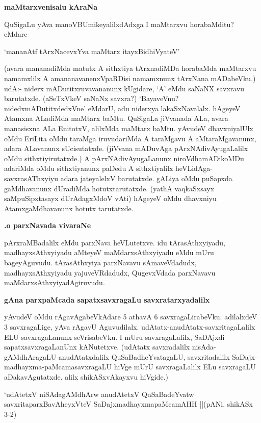   \noindent
  \textbf{maMtarxvenisalu kAraNa}\label{page120}
  
  QuSigaLu yAva manoVBUmikeyalilxdAdxga I maMtarxvu horabaMditu? eMdare-
 
 \begin{shloka}
 `mananAtf tArxNacevxYva maMtarx itayxBidhiVyateV'\label{121}
 \end{shloka}

(avara mananadiMda matutx A sithxtiya tArxnadiMDa horabaMda maMtarxvu namamxlilx A amananavanenxVpaRDisi namamxnunx tArxNana mADabeVku.) udA:- niderx
mADutitxruvavananunx kUgidare, `A' eMdu saNaNX savxravu barutatxde. (aSeTxVkeV saNaNx savxra?) `BayaveVnu? nidedxmADutitxdedxVne' eMdarU, adu niderxya lakaSxNavalalx. hAgeyeV Atamxna ALadiMda maMtarx baMtu. QuSigaLa jiVvanada ALa, avara manasisxna ALa EnitotxV, alilxMda maMtarx baMtu. yAvudeV dhavxniyalUlx oMdu EriLita oMdu taraMga iruvudariMda A taraMgavu A aMtaraMgavanunx, adara ALavanunx sUcisutatxde. (jiVvana mADuvAga pArxNAdivAyugaLalilx oMdu sithxtiyirutatxde.) A pArxNAdivAyugaLanunx niroVdhamADikoMDu adariMda oMdu sithxtiyanunx paDedu A sithxtiyalilx heVLidAga-savxrasAThxyiyu adara jateyalelxV barutatxde. gALiya oMdu puSapxda gaMdhavanunx dUradiMda hotutxtarutatxde. (yathA vaqkaSxsayx\label{121} saMpuSipxtasayx dUrAdagxMdoV vAti) hAgeyeV oMdu dhavxniyu AtamxgaMdhavanunx hotutx tarutatxde.

\noindent
\textbf{.o parxNavada vivaraNe} %

pArxraMBadalilx eMdu parxNava heVLutetxve. idu tArasAthxyiyadu, madhayxsAthxyiyadu aMteyeV maMdarxsAthxyiyadu eMdu mUru bageyAguvudu. tArasAthxyiya parxNavavu sAmaveVdadudx, madhayxsAthxyiyadu yajuveVRdadudx, QugevxVdada parxNavavu maMdarxsAthxyiyadAgiruvudu.

\noindent
\textbf{gAna parxpaMcada sapatxsavxragaLu savxratarxyadalilx}

yAvudeV oMdu rAgavAgabeVkAdare 5 athavA 6 savxragaLirabeVku. adilalxdeV 3 savxragaLige, yAva rAgavU Aguvudilalx. udAtatx-anudAtatx-savxritagaLalilx ELU savxragaLanunx seVrisabeVku. I mUru savxragaLalilx, SaDAjxdi sapatxsavxragaLanUnx kANutetxve. (udAtatx savxradalilx nisAda-gAMdhAragaLU anudAtatxdalilx QuSaBadheYvatagaLU, savxritadalilx SaDajx-madhayxma-paMcamasavxragaLU hiVge mUrU savxragaLalilx ELu savxragaLU aDakavAgutatxde. alilx shikASxvAkayxvu hiVgide.)

\begin{shloka}
`udAtetxV niSAdagAMdhArw anudAtetxV QuSaBadeYvatw|\\\label{122}
savxritaparxBavAheyxVteV SaDajxmadhayxmapaMcamAHH ||(pANi. shikASx 3-2)
\end{shloka}

